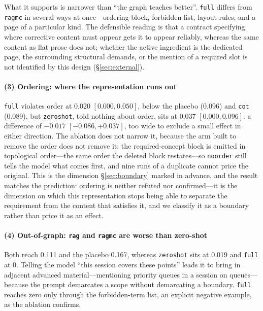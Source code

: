 \documentclass[review,12pt]{elsarticle}
\renewcommand{\_}{\kgunderscore\allowbreak}
\newcommand{\id}[1]{\texttt{#1}}
\begin{document}
What it supports is narrower than ``the graph teaches better''. \id{full} differs
from \id{rag\_mc} in several ways at once---ordering block, forbidden list, layout
rules, and a page of a particular kind. The defensible reading is that a
contract specifying where corrective content must appear gets it to appear
reliably, whereas the same content as flat prose does not; whether the active
ingredient is the dedicated page, the surrounding structural demands, or the
mention of a required slot is not identified by this design
(\S\ref{sec:external}).

\paragraph{(3) Ordering: where the representation runs out} \id{full} violates
order at 0.020 $[0.000, 0.050]$, below the placebo (0.096) and \id{cot} (0.089),
but \id{zero\_shot}, told nothing about order, sits at 0.037 $[0.000, 0.096]$: a
difference of $-0.017$ $[-0.086, +0.037]$, too wide to exclude a small effect in
either direction. The ablation does not narrow it, because the arm built to
remove the order does not remove it: the required-concept block is emitted in
topological order---the same order the deleted block restates---so
\id{no\_order} still tells the model what comes first, and nine runs of a
duplicate cannot price the original. This is the dimension
\S\ref{sec:boundary} marked in advance, and the result matches the prediction:
ordering is neither refuted nor confirmed---it is the dimension on
which this representation stops being able to separate the requirement from the
content that satisfies it, and we classify it as a boundary rather than price
it as an effect.

\paragraph{(4) Out-of-graph: \id{rag} and \id{rag\_mc} are worse than
zero-shot} Both reach 0.111 and the placebo 0.167, whereas \id{zero\_shot} sits at
0.019 and \id{full} at 0. Telling the model ``this session covers these points''
leads it to bring in adjacent advanced material---mentioning priority queues in a
session on queues---because the prompt demarcates a scope without demarcating a
boundary. \id{full} reaches zero only through the forbidden-term list, an explicit
negative example, as the ablation confirms.
\end{document}
